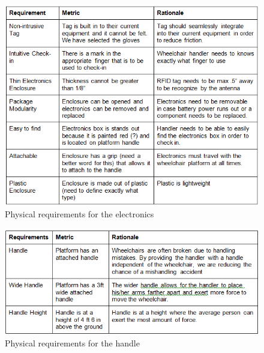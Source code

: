 \newpage

\begin{figure}[h!]
  \centering
     \includegraphics[scale=1]{images/physical_requirements_electronics.png}
   \caption{Physical requirements for the electronics}
  \label{fig:phy_req_electronics}
\end{figure}

\newpage

\begin{figure}[h!]
  \centering
     \includegraphics[scale=1]{images/physical_requirements_handle.png}
   \caption{Physical requirements for the handle}
  \label{fig:phy_req_handle}
\end{figure}

\newpage

